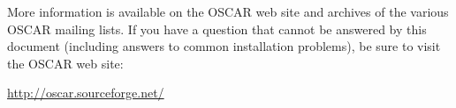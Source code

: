 More information is available on the OSCAR web site and archives of
the various OSCAR mailing lists.  If you have a question that cannot
be answered by this document (including answers to common installation
problems), be sure to visit the OSCAR web site:

\vspace{11pt}
\centerline{\url{http://oscar.sourceforge.net/}}

